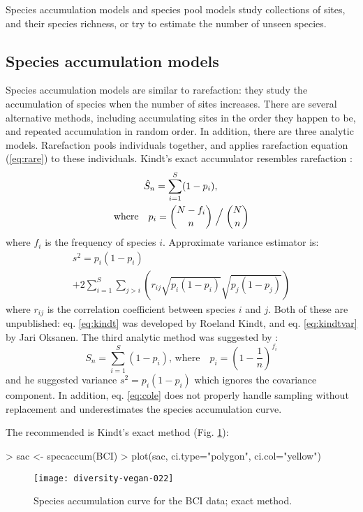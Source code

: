 \documentclass[a4paper,10pt,twocolumn]{article}
\begin{document}
Species accumulation models and species pool models study collections
of sites, and their species richness, or try to estimate the number of
unseen species.

\subsection{Species accumulation models}

Species accumulation models are similar to rarefaction: they study the
accumulation of species when the number of sites increases.  There are
several alternative methods, including accumulating sites in the order
they happen to be, and repeated accumulation in random order.  In
addition, there are three analytic models.  Rarefaction pools
individuals together, and applies rarefaction equation (\ref{eq:rare})
to these individuals.  Kindt's exact accumulator resembles rarefaction
\citep{UglandEtal03}:
\begin{multline}
\label{eq:kindt}
\hat S_n = \sum_{i=1}^S (1 - p_i), \, \\ \text{where} \quad  p_i = {N- f_i
\choose n} \Bigm / {N \choose n}
\end{multline}
where $f_i$ is the frequency of species $i$.  Approximate variance
estimator is:
\begin{multline}
\label{eq:kindtvar}
s^2 = p_i (1 - p_i)  \\ + 2 \sum_{i=1}^S \sum_{j>i} \left( r_{ij}
  \sqrt{p_i(1-p_i)} \sqrt{p_j (1-p_j)}\right)
\end{multline}
where $r_{ij}$ is the correlation coefficient between species $i$ and
$j$.  Both of these are unpublished: eq. \ref{eq:kindt} was developed
by Roeland Kindt, and eq. \ref{eq:kindtvar} by Jari Oksanen. The third
analytic method was suggested by \citet{Coleman82}:
\begin{equation}
\label{eq:cole}
S_n = \sum_{i=1}^S (1 - p_i), \, \text{where} \quad p_i = \left(1 - \frac{1}{n}\right)^{f_i}
\end{equation}
and he suggested variance $s^2 = p_i (1-p_i)$ which ignores the
covariance component.  In addition, eq. \ref{eq:cole} does not
properly handle sampling without replacement and underestimates the
species accumulation curve.

The recommended is Kindt's exact method (Fig. \ref{fig:sac}):
\begin{Schunk}
\begin{Sinput}
> sac <- specaccum(BCI)
> plot(sac, ci.type="polygon", ci.col="yellow")
\end{Sinput}
\end{Schunk}
\begin{figure}
\texttt{[image: diversity-vegan-022]}
\caption{Species accumulation curve for the BCI data; exact method.}
\label{fig:sac}
\end{figure}
\end{document}
